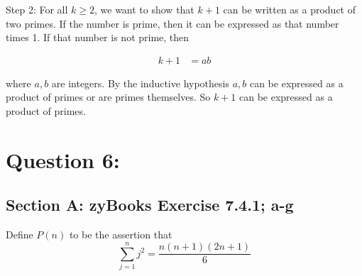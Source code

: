 \documentclass[14pt]{extreport}
\begin{document}
\medskip

Step 2: For all \( k \geq 2 \), we want to show that \( k + 1 \) can be written as a product of two primes. If the number is prime, then it can be expressed as that number times 1. If that number is not prime, then

\begin{align*}
    k + 1 &= ab
\end{align*}

where \( a, b \) are integers. By the inductive hypothesis \( a, b \) can be expressed as a product of primes or are primes themselves. So \( k + 1 \) can be expressed as a product of primes.

\section*{Question 6:}

\subsection*{Section A: zyBooks Exercise 7.4.1; a-g}

Define \( P(n) \) to be the assertion that 
\[
    \sum_{j=1}^n j^2 = \frac{n(n + 1)(2n + 1)}{6}
\]
\end{document}
